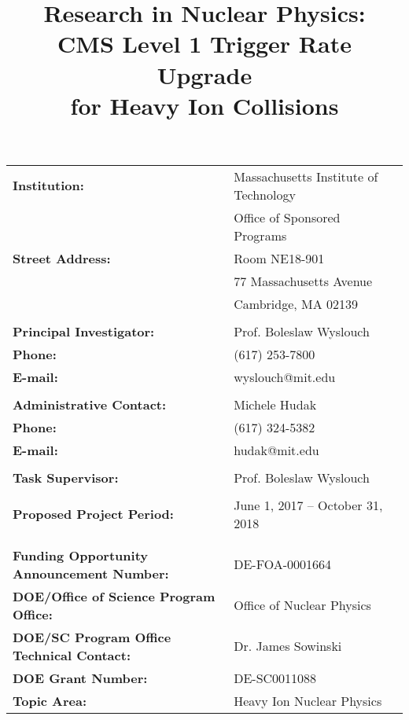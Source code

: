 \begin{titlepage}
\vspace{2.2 cm}
\title{\textbf{Research in Nuclear Physics:\\
CMS Level 1 Trigger Rate Upgrade\\ for Heavy Ion Collisions}}

\vspace{.2 cm} 

\begin{center}
\begin{tabular}{ll}
 
\textbf{Institution:}                & Massachusetts Institute of Technology \\
                                     & Office of Sponsored Programs\\
\textbf{Street Address:} &	Room NE18-901 \\
				& 77 Massachusetts Avenue \\
				&	Cambridge, MA 02139 \\
& \\
\textbf{Principal Investigator:} & 	Prof. Boleslaw Wyslouch \\
\textbf{Phone:} & 			(617) 253-7800 \\
\textbf{E-mail:} & 			wyslouch@mit.edu \\
& \\
\textbf{Administrative Contact:} &	Michele Hudak \\
\textbf{Phone:} & 			(617) 324-5382 \\
\textbf{E-mail:} & 			hudak@mit.edu \\
& \\
\textbf{Task Supervisor:} &		Prof. Boleslaw Wyslouch \\
& \\
\textbf{Proposed Project Period:} &	June 1, 2017 – October 31, 2018 \\
&\\
& \\
\textbf{Funding Opportunity Announcement Number:} & 	DE-FOA-0001664 \\
\textbf{DOE/Office of Science Program Office:} & 		Office of Nuclear Physics \\ 
\textbf{DOE/SC Program Office Technical Contact:} & 	Dr. James Sowinski \\
\textbf{DOE Grant Number:} &				DE-SC0011088 \\
\textbf{Topic Area:	} &					Heavy Ion Nuclear Physics \\

\end{tabular}
\end{center}



\end{titlepage}





